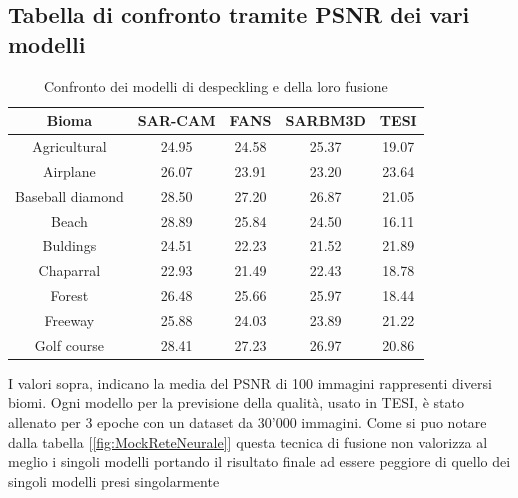 \subsection{Tabella di confronto tramite PSNR dei vari modelli  }
\begin{table}[H] %
    \centering
    \begin{tabular}{|c|c|c|c|c|}
    \hline
    Bioma & SAR-CAM & FANS & SARBM3D & TESI \\ \hline
    Agricultural &  24.95  & 24.58  & 25.37 & 19.07  \\ \hline
    Airplane & 26.07 & 23.91 & 23.20 & 23.64 \\ \hline
    Baseball diamond & 28.50 & 27.20 & 26.87 &  21.05\\ \hline
    Beach & 28.89 & 25.84 & 24.50 & 16.11 \\ \hline
    Buldings & 24.51 & 22.23 & 21.52 & 21.89 \\ \hline
    Chaparral & 22.93 & 21.49 & 22.43 & 18.78 \\ \hline
    Forest & 26.48 & 25.66 & 25.97 & 18.44 \\ \hline
    Freeway & 25.88 & 24.03 &  23.89 & 21.22 \\ \hline
    Golf course& 28.41 & 27.23 & 26.97 & 20.86 \\ \hline
    \end{tabular}
    \caption{Confronto dei modelli di despeckling e della loro fusione}
    \label{tab:esempio}
    \end{table}
    I valori sopra, indicano la media del PSNR di 100 immagini rappresenti diversi biomi.
    Ogni modello per la previsione della qualità, usato in TESI, 
    è stato allenato per 3 epoche con un dataset da 30'000 
    immagini. Come si puo notare dalla tabella [\ref{fig:MockReteNeurale}] 
    questa tecnica di fusione non valorizza al meglio i singoli modelli 
    portando il risultato finale ad essere peggiore di quello dei 
    singoli modelli presi singolarmente
    


